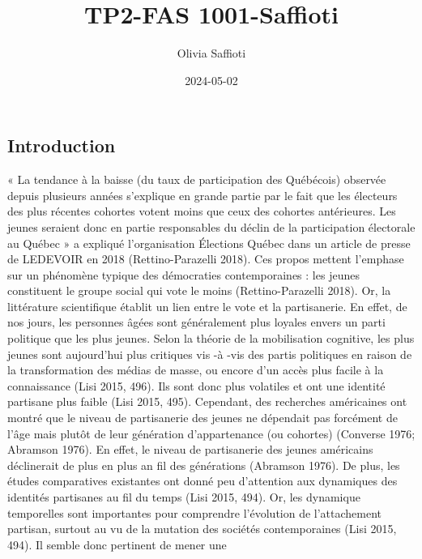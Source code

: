\documentclass[
  letterpaper,
  DIV=11,
  numbers=noendperiod]{scrartcl}
\title{TP2-FAS 1001-Saffioti}
\author{Olivia Saffioti}
\date{2024-05-02}
\begin{document}
\maketitle
\ifdefined\Shaded\renewenvironment{Shaded}{\begin{tcolorbox}[interior hidden, enhanced, breakable, boxrule=0pt, borderline west={3pt}{0pt}{shadecolor}, frame hidden, sharp corners]}{\end{tcolorbox}}\fi

\hypertarget{introduction}{%
\subsection{Introduction}\label{introduction}}

« La tendance à la baisse (du taux de participation des Québécois)
observée depuis plusieurs années s'explique en grande partie par le fait
que les électeurs des plus récentes cohortes votent moins que ceux des
cohortes antérieures. Les jeunes seraient donc en partie responsables du
déclin de la participation électorale au Québec » a expliqué
l'organisation Élections Québec dans un article de presse de LEDEVOIR en
2018 (Rettino-Parazelli 2018). Ces propos mettent l'emphase sur un
phénomène typique des démocraties contemporaines : les jeunes
constituent le groupe social qui vote le moins (Rettino-Parazelli 2018).
Or, la littérature scientifique établit un lien entre le vote et la
partisanerie. En effet, de nos jours, les personnes âgées sont
généralement plus loyales envers un parti politique que les plus jeunes.
Selon la théorie de la mobilisation cognitive, les plus jeunes sont
aujourd'hui plus critiques vis -à -vis des partis politiques en raison
de la transformation des médias de masse, ou encore d'un accès plus
facile à la connaissance (Lisi 2015, 496). Ils sont donc plus volatiles
et ont une identité partisane plus faible (Lisi 2015, 495). Cependant,
des recherches américaines ont montré que le niveau de partisanerie des
jeunes ne dépendait pas forcément de l'âge mais plutôt de leur
génération d'appartenance (ou cohortes) (Converse 1976; Abramson 1976).
En effet, le niveau de partisanerie des jeunes américains déclinerait de
plus en plus an fil des générations (Abramson 1976). De plus, les études
comparatives existantes ont donné peu d'attention aux dynamiques des
identités partisanes au fil du temps (Lisi 2015, 494). Or, les dynamique
temporelles sont importantes pour comprendre l'évolution de
l'attachement partisan, surtout au vu de la mutation des sociétés
contemporaines (Lisi 2015, 494). Il semble donc pertinent de mener une
\end{document}
